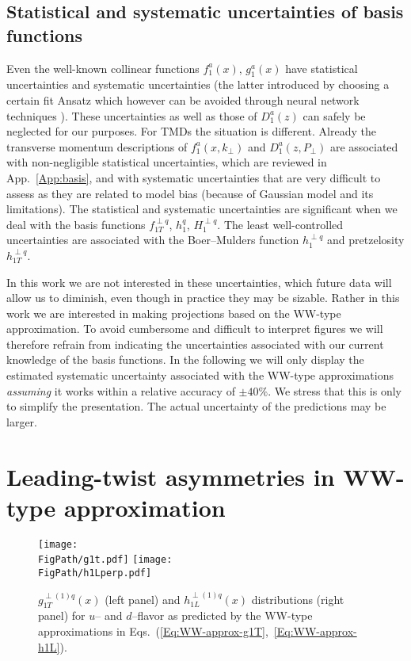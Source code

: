 \documentclass[a4paper,11pt]{article}
\def\kperp{k_\perp}
\def\pperp{P_\perp}
\newcommand*{\FigPath}{./figs}%
\begin{document}
\subsection{Statistical and systematic uncertainties of basis functions}

Even the well-known collinear functions $f_1^a(x)$, $g_1^a(x)$ have 
statistical uncertainties and systematic uncertainties (the latter
introduced by choosing a certain fit Ansatz which however can be 
avoided through neural network techniques \cite{Ball:2014uwa}).
These uncertainties as well as those of $D_1^a(z)$ can safely
be neglected for our purposes. 
For TMDs the situation is different. Already the transverse
momentum descriptions of $f_1^a(x,\kperp)$ and $D_1^a(z,\pperp)$ 
are associated with non-negligible statistical uncertainties,
which are reviewed in App.~\ref{App:basis}, and with systematic
uncertainties that are very difficult to assess as they are
related to model bias (because of Gaussian model and its limitations).
The statistical and systematic uncertainties are significant
when we deal with the basis functions 
$f_{1T}^{\perp q}$, $h_{1}^{q}$, $H_{1}^{\perp q}$.
The least well-controlled uncertainties are associated with the 
Boer--Mulders function $h_1^{\perp q}$ and pretzelosity $h_{1T}^{\perp q}$.

In this work we are not interested in these uncertainties, which
future data will allow us to diminish, even though in practice 
they may be sizable. Rather in this work we are interested in
making projections based on the WW-type approximation. To avoid
cumbersome and difficult to interpret figures we will therefore
refrain from indicating the uncertainties associated with our
current knowledge of the basis functions. In the following
we will only display the estimated systematic uncertainty
associated with the WW-type approximations {\it assuming}
it works within a relative accuracy of $\pm40\%$.
We stress that this is only to simplify the presentation. The 
actual uncertainty of the predictions may be larger.



\section{Leading-twist asymmetries in WW-type approximation}
\label{Sec-6:twist-2-and-WW}
\begin{figure}[htb]
\centering
\texttt{[image: \\FigPath/g1t.pdf]} \quad
\texttt{[image: \\FigPath/h1Lperp.pdf]}
	\caption{\label{g1t_h1l_functions} 
	$g^{\perp (1) q}_{1T}(x)$ (left panel) and
	$h^{\perp (1) q}_{1L}(x)$ distributions (right panel) 
	for $u$-- and $d$--flavor 
	as predicted by the WW-type approximations in
	Eqs.~(\ref{Eq:WW-approx-g1T},~\ref{Eq:WW-approx-h1L}).}
\end{figure}
\end{document}
